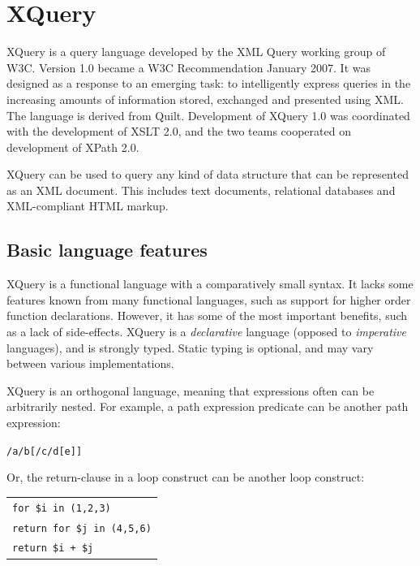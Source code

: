 \section{XQuery}
\label{sect:theory:xquery}

XQuery is a query language developed by the XML Query working group of W3C.
Version 1.0\cite{w3c00} became a W3C Recommendation January 2007. It was
designed as a response to an emerging task: to intelligently express queries in
the increasing amounts of information stored, exchanged and presented using
XML. The language is derived from Quilt\cite{quilt_queryLanguage}. Development
of XQuery 1.0 was coordinated with the development of XSLT 2.0, and the two
teams cooperated on development of XPath 2.0.

XQuery can be used to query any kind of data structure that can be represented
as an XML document. This includes text documents, relational databases and XML-compliant HTML markup.

\subsection{Basic language features}
\label{sect:theory:xquery:basics}
XQuery is a functional language with a comparatively small syntax. It lacks
some features known from many functional languages, such as support for higher
order function declarations. However, it has some of the most important benefits, such as a lack of side-effects. XQuery is a
\textit{declarative} language (opposed to \textit{imperative} languages), and is strongly typed.
Static typing is optional, and may vary between various implementations.


XQuery is an orthogonal language, meaning that expressions often can be
arbitrarily nested. For example, a path expression predicate can be another
path expression:
\begin{center}
\texttt{/a/b[/c/d[e]]}
\end{center}
Or, the return-clause in a loop construct can be another loop
construct:
\begin{center}
\begin{tabular}{l}
\texttt{for \$i in (1,2,3) } \\ \quad 
\texttt{return for \$j in (4,5,6)} \\ \quad\quad 
\texttt{return \$i + \$j}
\end{tabular}
\end{center}

